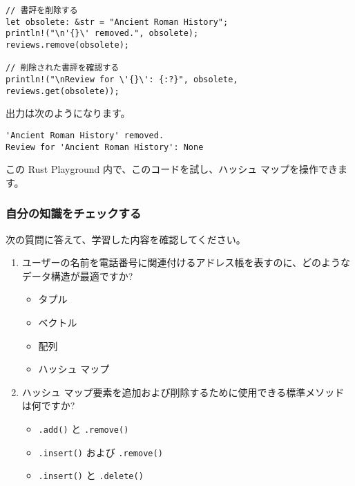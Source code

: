 \begin{lstlisting}[numbers=none]
// 書評を削除する
let obsolete: &str = "Ancient Roman History";
println!("\n'{}\' removed.", obsolete);
reviews.remove(obsolete);

// 削除された書評を確認する
println!("\nReview for \'{}\': {:?}", obsolete, reviews.get(obsolete));
\end{lstlisting}

出力は次のようになります。

\begin{lstlisting}[numbers=none]
'Ancient Roman History' removed.
Review for 'Ancient Roman History': None
\end{lstlisting}

この Rust Playground 内で、このコードを試し、ハッシュ マップを操作できます。

\subsubsection{自分の知識をチェックする}

次の質問に答えて、学習した内容を確認してください。


\begin{enumerate}
\item ユーザーの名前を電話番号に関連付けるアドレス帳を表すのに、どのようなデータ構造が最適ですか?

\begin{itemize}
\item タプル

\item ベクトル

\item 配列

\item ハッシュ マップ
\end{itemize}

\item ハッシュ マップ要素を追加および削除するために使用できる標準メソッドは何ですか?
\begin{itemize}
\item \texttt{.add()} と \texttt{.remove()}

\item \texttt{.insert()} および \texttt{.remove()}

\item \texttt{.insert()} と \texttt{.delete()}
\end{itemize}

\end{enumerate}
